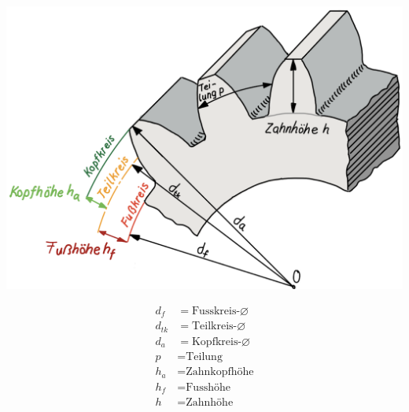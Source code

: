 \vspace{2mm}

\begin{footnotesize}
    \vspace{-1mm}
\end{footnotesize}
\begin{minipage}{0.58\linewidth}
    \begin{center}
        \includegraphics[width = 1.1\linewidth]{src/images/MAEIP_Zahnrad}
    \end{center}
\end{minipage}
\begin{minipage}{0.35\linewidth}
    \begin{center}
        \begin{scriptsize}
            \begin{align*}
                d_f &= \text{Fusskreis-} \varnothing
                \\d_{tk} &= \text{Teilkreis-} \varnothing
                \\d_a &= \text{Kopfkreis-} \varnothing
                \\ p&= \text{Teilung}
                \\ h_a &= \text{Zahnkopfhöhe} 
                \\ h_f &= \text{Fusshöhe}
                \\ h &= \text{Zahnhöhe}
             \end{align*}
        \end{scriptsize}    
    \end{center}
\end{minipage}

